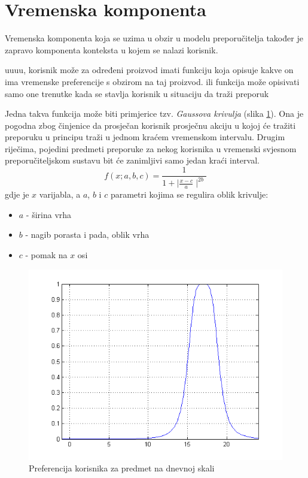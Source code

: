 \documentclass[times, utf8, diplomski, numeric]{fer}
\begin{document}
\section{Vremenska komponenta}

Vremenska komponenta koja se uzima u obzir u modelu preporučitelja također je
zapravo komponenta konteksta u kojem se nalazi korisnik. 

uuuu, korisnik može za određeni proizvod imati funkciju koja opisuje kakve on
ima vremenske preferencije s obzirom na taj proizvod. ili funkcija može
opisivati samo one trenutke kada se stavlja korisnik u situaciju da traži
preporuk

Jedna takva funkcija može biti primjerice tzv. \emph{Gaussova krivulja}
(slika \ref{fig:Gauss1}). Ona je pogodna zbog činjenice da prosječan korisnik
prosječnu akciju u kojoj će tražiti preporuku u principu traži u jednom kraćem
vremenskom intervalu. Drugim riječima, pojedini predmeti preporuke za nekog
korisnika u vremenski svjesnom preporučiteljskom sustavu bit će zanimljivi samo
jedan kraći interval.
\begin{equation}
	\label{eq:BellFunc}
	f(x;a,b,c) = \frac
	{
		1
	}
	{
		1 + \mid\frac{x - c}{a}\mid^{2b}
	}
\end{equation}
gdje je $x$ varijabla, a $a$, $b$ i $c$ parametri kojima se regulira oblik
krivulje:
\begin{itemize}
  \item $a$ - širina vrha
  \item $b$ - nagib porasta i pada, oblik vrha
  \item $c$ - pomak na $x$ osi
\end{itemize}

\begin{figure}[htb]
	\centering
	\includegraphics[width=12cm]{images/zvonolika1matlab.png}
	\caption{Preferencija korisnika za predmet na dnevnoj skali}
	\label{fig:Gauss1}
\end{figure}
\end{document}
